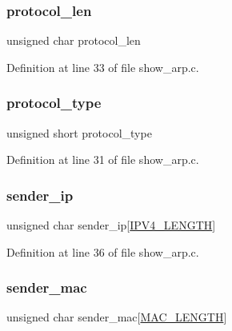 \subsubsection{\texorpdfstring{protocol\+\_\+len}{protocol\_len}}
{\footnotesize\ttfamily unsigned char protocol\+\_\+len}



Definition at line 33 of file show\+\_\+arp.\+c.

\hypertarget{structarp__header_a24dd89b1e5b9c31d4c2655df0d838673}{}\label{structarp__header_a24dd89b1e5b9c31d4c2655df0d838673} 
\subsubsection{\texorpdfstring{protocol\+\_\+type}{protocol\_type}}
{\footnotesize\ttfamily unsigned short protocol\+\_\+type}



Definition at line 31 of file show\+\_\+arp.\+c.

\hypertarget{structarp__header_acf457b77e1ea289ae333fd2287954758}{}\label{structarp__header_acf457b77e1ea289ae333fd2287954758} 
\subsubsection{\texorpdfstring{sender\+\_\+ip}{sender\_ip}}
{\footnotesize\ttfamily unsigned char sender\+\_\+ip\mbox{[}\hyperlink{show__arp_8c_a9935c761f5e47454f667f0d5e4208e89}{I\+P\+V4\+\_\+\+L\+E\+N\+G\+TH}\mbox{]}}



Definition at line 36 of file show\+\_\+arp.\+c.

\hypertarget{structarp__header_abb59a40a80872088400763e1fd6acaf2}{}\label{structarp__header_abb59a40a80872088400763e1fd6acaf2} 
\subsubsection{\texorpdfstring{sender\+\_\+mac}{sender\_mac}}
{\footnotesize\ttfamily unsigned char sender\+\_\+mac\mbox{[}\hyperlink{show__arp_8c_ac941b6796b26d46622ba39ad70667ed3}{M\+A\+C\+\_\+\+L\+E\+N\+G\+TH}\mbox{]}}



